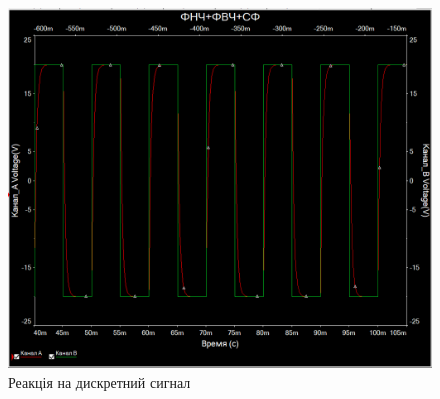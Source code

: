 \documentclass[
  ukrainian,
  14pt
]{extreport}
\begin{document}
\begin{figure}[H]
  \centering
  \includegraphics[width=.6\textwidth]{imgs/FNC-4.png}
  \caption{Реакція на дискретний сигнал}
\end{figure}
\end{document}

